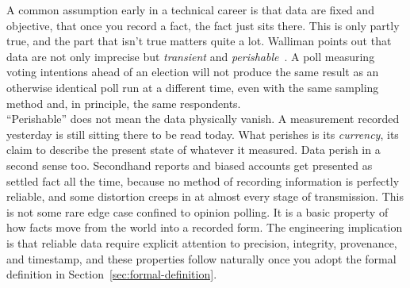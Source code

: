 A common assumption early in a technical career is that data are fixed and
objective, that once you record a fact, the fact just sits there. This is only
partly true, and the part that isn't true matters quite a lot. Walliman points
out that data are not only imprecise but \emph{transient} and
\emph{perishable}~\autocite{walliman2011}. A poll measuring voting intentions
ahead of an election will not produce the same result as an otherwise
identical poll run at a different time, even with the same sampling method
and, in principle, the same respondents.\\
``Perishable'' does not mean the data physically vanish. A measurement
recorded yesterday is still sitting there to be read today. What perishes is
its \emph{currency}, its claim to describe the present state of whatever it
measured. Data perish in a second sense too. Secondhand reports and biased
accounts get presented as settled fact all the time, because no method of
recording information is perfectly reliable, and some distortion creeps in at
almost every stage of transmission. This is not some rare edge case confined to
opinion polling. It is a basic property of how facts move from the world into
a recorded form. The engineering implication is that reliable data require
explicit attention to precision, integrity, provenance, and timestamp, and
these properties follow naturally once you adopt the formal definition in
Section~\ref{sec:formal-definition}.